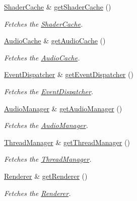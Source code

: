 \begin{DoxyCompactItemize}
\mbox{\hyperlink{classsage_1_1ShaderCache}{Shader\+Cache}} \& \mbox{\hyperlink{classsage_1_1Application_a2968bb7e8ae2247aa49d1092f24a751a}{get\+Shader\+Cache}} ()
\begin{DoxyCompactList}\small\item\em Fetches the \mbox{\hyperlink{classsage_1_1ShaderCache}{Shader\+Cache}}. \end{DoxyCompactList}\item 
\mbox{\hyperlink{classsage_1_1AudioCache}{Audio\+Cache}} \& \mbox{\hyperlink{classsage_1_1Application_a68d5ca5d6fd24fa3ec8354e8ec62227a}{get\+Audio\+Cache}} ()
\begin{DoxyCompactList}\small\item\em Fetches the \mbox{\hyperlink{classsage_1_1AudioCache}{Audio\+Cache}}. \end{DoxyCompactList}\item 
\mbox{\hyperlink{classsage_1_1EventDispatcher}{Event\+Dispatcher}} \& \mbox{\hyperlink{classsage_1_1Application_abdc4b687788236f83fbb879465d80efe}{get\+Event\+Dispatcher}} ()
\begin{DoxyCompactList}\small\item\em Fetches the \mbox{\hyperlink{classsage_1_1EventDispatcher}{Event\+Dispatcher}}. \end{DoxyCompactList}\item 
\mbox{\hyperlink{classsage_1_1AudioManager}{Audio\+Manager}} \& \mbox{\hyperlink{classsage_1_1Application_a717c0e8323d219589975f607ab561462}{get\+Audio\+Manager}} ()
\begin{DoxyCompactList}\small\item\em Fetches the \mbox{\hyperlink{classsage_1_1AudioManager}{Audio\+Manager}}. \end{DoxyCompactList}\item 
\mbox{\hyperlink{classsage_1_1ThreadManager}{Thread\+Manager}} \& \mbox{\hyperlink{classsage_1_1Application_a8cf21b81ebd78065cef478cc57847eab}{get\+Thread\+Manager}} ()
\begin{DoxyCompactList}\small\item\em Fetches the \mbox{\hyperlink{classsage_1_1ThreadManager}{Thread\+Manager}}. \end{DoxyCompactList}\item 
\mbox{\hyperlink{classsage_1_1Renderer}{Renderer}} \& \mbox{\hyperlink{classsage_1_1Application_a023b31b837007c82c91dab8be17d149c}{get\+Renderer}} ()
\begin{DoxyCompactList}\small\item\em Fetches the \mbox{\hyperlink{classsage_1_1Renderer}{Renderer}}. \end{DoxyCompactList}\item 

\end{DoxyCompactItemize}
